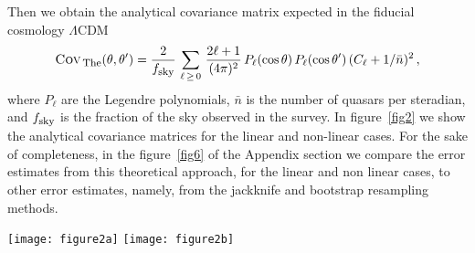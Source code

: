 \documentclass[a4paper,11pt]{article}
\begin{document}
\noindent
Then we obtain the analytical covariance matrix expected in the fiducial cosmology $\Lambda$CDM 
\begin{eqnarray}\label{eqCov}
\mbox{\sc Cov}_{\mbox{\footnotesize \,The}}(\theta,\theta') = \frac{2}{f_{\mbox{\footnotesize sky}}} \, 
\sum_{\ell \, \ge \, 0} \, \frac{2 \ell + 1}{(4\pi)^2} \, P_{\ell}(\cos \theta) \, P_{\ell}(\cos \theta') \, 
(C_{\ell} + 1/{\bar{n}})^2 \, ,
\end{eqnarray}
where $P_{\ell}$ are the Legendre polynomials, $\bar{n}$ is the number of quasars per steradian, 
and $f_{\mbox{\footnotesize sky}}$ is the fraction of the sky observed in the survey. 
In figure~\ref{fig2} we show the analytical covariance matrices for the linear and non-linear cases. 
For the sake of completeness, in the figure~\ref{fig6} of the Appendix section we compare the error estimates from this theoretical approach, for the linear and non linear cases, to other error estimates, namely, from the jackknife and bootstrap resampling methods.



\begin{figure*}[h!]
\hspace{-0.95cm}
\texttt{[image: figure2a]}
\hspace{-1.5cm}
\texttt{[image: figure2b]}
%
\caption{
Analytical covariance matrices, given by eq.~\ref{eqCov}, in the linear (left panel) and non-linear 
(right panel) cases.
}
\label{fig2}
\end{figure*}
\end{document}
